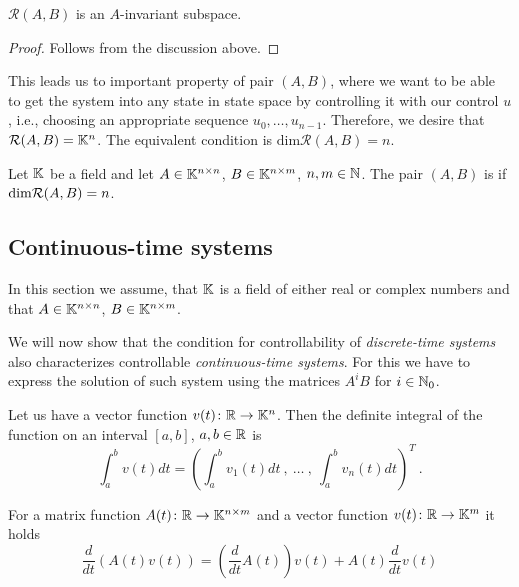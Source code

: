 \begin{lemma}
	\label{lem:reachinv}
	$\mathcal{R}(A,B)$ is an $A$-invariant subspace.
\end{lemma} 

\begin{proof}
	Follows from the discussion above.
\end{proof}

This leads us to important property of pair $(A,B)$, where we want to be able to get the system into any state in state space by controlling it with our control $u$, i.e., choosing an appropriate sequence $u_0,\ldots,u_{n-1}$. Therefore, we desire that $\mathcal{R}(A,B)=\mathbb{K}^n$. The equivalent condition is $\text{dim}\mathcal{R}(A,B)=n$.

\begin{definition}
	Let $\mathbb{K}$ be a field and let $A \in \mathbb{K}^{n \times n}$, $B \in \mathbb{K}^{n \times m}$, $n,m \in \mathbb{N}$. The pair $(A,B)$ is  if $\textnormal{dim}\mathcal{R}(A,B)=n$.
\end{definition}

\subsection{Continuous-time systems}

\begin{remark}
	In this section we assume, that $\mathbb{K}$ is a field of either real or complex numbers and that $A\in\mathbb{K}^{n\times n}$, $B\in\mathbb{K}^{n\times m}$.
\end{remark}

We will now show that the condition for controllability of \textit{discrete-time systems} also characterizes controllable \textit{continuous-time systems}. For this we have to express the solution of such system using the matrices $A^iB$ for $i\in \mathbb{N}_0$.

\begin{definition}
	Let us have a vector function $v(t)\colon\mathbb{R}\to\mathbb{K}^n$. Then the definite integral of the function on an interval $[a,b]$, $a,b\in\mathbb{R}$ is
	$$\int_a^bv(t)dt=\left(\int_a^bv_1(t)dt\ ,\ \ldots\ ,\ \int_a^bv_n(t)dt\right)^T\ .$$
\end{definition}

\begin{lemma}
\label{lem:matrixTimesVectorDerivative}
	For a matrix function $A(t)\colon\mathbb{R}\to\mathbb{K}^{n\times m}$ and a vector function $v(t)\colon\mathbb{R}\to\mathbb{K}^m$ it holds 
	$$\frac{d}{dt}\left(A(t)v(t)\right)=\left(\frac{d}{dt}A(t)\right)v(t)+A(t)\frac{d}{dt}v(t)$$
\end{lemma}

